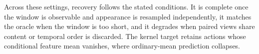 Across these settings, recovery follows the stated conditions. It is
complete once the window is observable and appearance is resampled
independently, it matches the oracle when the window is too short, and it
degrades when paired views share content or temporal order is discarded.
The kernel target retains actions whose conditional feature mean vanishes,
where ordinary-mean prediction collapses.
